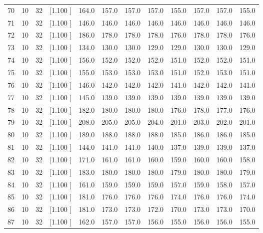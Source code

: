 \documentclass[12pt,a4paper]{article}
\begin{document}
\begin{center}
{\begin{tabular}{r r r r r r r r r r r r}
  70& 10& 32&[1.100     ]&   164.0&   157.0&   157.0&   157.0&   155.0&   157.0&   157.0&   155.0\\[-0.02in]
  71& 10& 32&[1.100     ]&   146.0&   146.0&   146.0&   146.0&   146.0&   146.0&   146.0&   146.0\\[-0.02in]
  72& 10& 32&[1.100     ]&   186.0&   178.0&   178.0&   178.0&   176.0&   178.0&   178.0&   176.0\\[-0.02in]
  73& 10& 32&[1.100     ]&   134.0&   130.0&   130.0&   129.0&   129.0&   130.0&   130.0&   129.0\\[-0.02in]
  74& 10& 32&[1.100     ]&   156.0&   152.0&   152.0&   152.0&   151.0&   152.0&   152.0&   151.0\\[-0.02in]
  75& 10& 32&[1.100     ]&   155.0&   153.0&   153.0&   153.0&   151.0&   152.0&   153.0&   151.0\\[-0.02in]
  76& 10& 32&[1.100     ]&   146.0&   142.0&   142.0&   142.0&   141.0&   142.0&   142.0&   141.0\\[-0.02in]
  77& 10& 32&[1.100     ]&   145.0&   139.0&   139.0&   139.0&   139.0&   139.0&   139.0&   139.0\\[-0.02in]
  78& 10& 32&[1.100     ]&   182.0&   180.0&   180.0&   180.0&   176.0&   178.0&   177.0&   176.0\\[-0.02in]
  79& 10& 32&[1.100     ]&   208.0&   205.0&   205.0&   204.0&   201.0&   203.0&   202.0&   201.0\\[-0.02in]
  80& 10& 32&[1.100     ]&   189.0&   188.0&   188.0&   188.0&   185.0&   186.0&   186.0&   185.0\\[-0.02in]
  81& 10& 32&[1.100     ]&   144.0&   141.0&   141.0&   140.0&   137.0&   139.0&   139.0&   137.0\\[-0.02in]
  82& 10& 32&[1.100     ]&   171.0&   161.0&   161.0&   160.0&   159.0&   160.0&   160.0&   158.0\\[-0.02in]
  83& 10& 32&[1.100     ]&   183.0&   180.0&   180.0&   180.0&   179.0&   180.0&   180.0&   179.0\\[-0.02in]
  84& 10& 32&[1.100     ]&   161.0&   159.0&   159.0&   159.0&   157.0&   159.0&   158.0&   157.0\\[-0.02in]
  85& 10& 32&[1.100     ]&   181.0&   176.0&   176.0&   176.0&   174.0&   176.0&   176.0&   174.0\\[-0.02in]
  86& 10& 32&[1.100     ]&   181.0&   173.0&   173.0&   172.0&   170.0&   173.0&   173.0&   170.0\\[-0.02in]
  87& 10& 32&[1.100     ]&   162.0&   157.0&   157.0&   156.0&   155.0&   156.0&   156.0&   155.0\\[-0.02in]

\end{tabular}}
\end{center}
\end{document}
